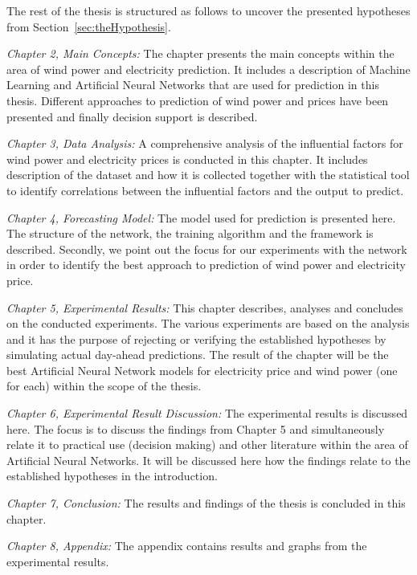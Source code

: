 The rest of the thesis is structured as follows to uncover the presented hypotheses from Section~\ref{sec:theHypothesis}. 

\emph{Chapter 2, Main Concepts:} The chapter presents the main concepts within the area of wind power and electricity prediction. It includes a description of Machine Learning and Artificial Neural Networks that are used for prediction in this thesis. Different approaches to prediction of wind power and prices have been presented and finally decision support is described. 

\emph{Chapter 3, Data Analysis:} A comprehensive analysis of the influential factors for wind power and electricity prices is conducted in this chapter. It includes description of the dataset and how it is collected together with the statistical tool to identify correlations between the influential factors and the output to predict.

\emph{Chapter 4, Forecasting Model:} The model used for prediction is presented here. The structure of the network, the training algorithm and the framework is described. Secondly, we point out the focus for our experiments with the network in order to identify the best approach to prediction of wind power and electricity price. 

\emph{Chapter 5, Experimental Results:} This chapter describes, analyses and concludes on the conducted experiments. The various experiments are based on the analysis and it has the purpose of rejecting or verifying the established hypotheses by simulating actual day-ahead predictions. The result of the chapter will be the best Artificial Neural Network models for electricity price and wind power (one for each) within the scope of the thesis.

\emph{Chapter 6, Experimental Result Discussion:} The experimental results is discussed here. The focus is to discuss the findings from Chapter 5 and simultaneously relate it to practical use (decision making) and other literature within the area of Artificial Neural Networks. It will be discussed here how the findings relate to the established hypotheses in the introduction.  

\emph{Chapter 7, Conclusion:} The results and findings of the thesis is concluded in this chapter.

\emph{Chapter 8, Appendix:} The appendix contains results and graphs from the experimental results.  
